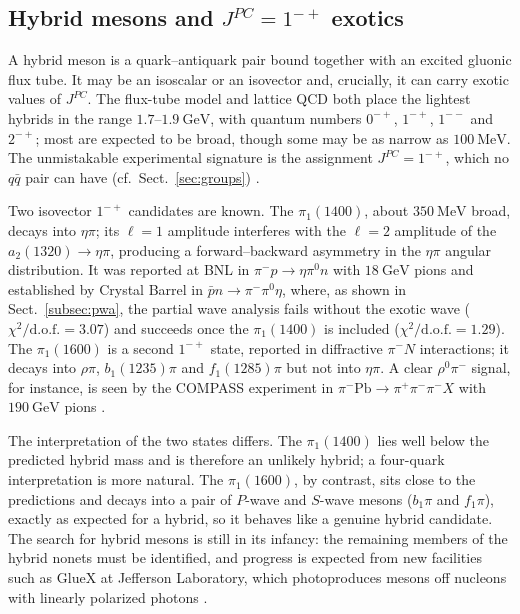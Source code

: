 \FloatBarrier

\subsection{Hybrid mesons and $J^{PC}=1^{-+}$ exotics}
\label{subsec:hybrids}

A hybrid meson is a quark--antiquark pair bound together with an excited gluonic
flux tube. It may be an isoscalar or an isovector and, crucially, it can carry
exotic values of $J^{PC}$. The flux-tube model and lattice QCD both place the
lightest hybrids in the range $1.7$--$1.9~\mathrm{GeV}$, with quantum numbers
$0^{-+}$, $1^{-+}$, $1^{--}$ and $2^{-+}$; most are expected to be broad, though
some may be as narrow as $100~\mathrm{MeV}$. The unmistakable experimental signature
is the assignment $J^{PC}=1^{-+}$, which no $q\bar q$ pair can have (cf.\
Sect.~\ref{sec:groups}) \cite[Ch.~11]{Amsler2018}.

Two isovector $1^{-+}$ candidates are known. The $\pi_1(1400)$, about
$350~\mathrm{MeV}$ broad, decays into $\eta\pi$; its $\ell=1$ amplitude interferes
with the $\ell=2$ amplitude of the $a_2(1320)\to\eta\pi$, producing a
forward--backward asymmetry in the $\eta\pi$ angular distribution. It was reported
at BNL in $\pi^-p\to\eta\pi^0 n$ with $18~\mathrm{GeV}$ pions and established by
Crystal Barrel in $\bar p n\to\pi^-\pi^0\eta$, where, as shown in
Sect.~\ref{subsec:pwa}, the partial wave analysis fails without the exotic wave
($\chi^2/\mathrm{d.o.f.}=3.07$) and succeeds once the $\pi_1(1400)$ is included
($\chi^2/\mathrm{d.o.f.}=1.29$). The $\pi_1(1600)$ is a second $1^{-+}$ state,
reported in diffractive $\pi^- N$ interactions; it decays into $\rho\pi$,
$b_1(1235)\pi$ and $f_1(1285)\pi$ but not into $\eta\pi$. A clear $\rho^0\pi^-$
signal, for instance, is seen by the COMPASS experiment in
$\pi^- \mathrm{Pb}\to\pi^+\pi^-\pi^- X$ with $190~\mathrm{GeV}$ pions
\cite[Ch.~11]{Amsler2018}.

The interpretation of the two states differs. The $\pi_1(1400)$ lies well below the
predicted hybrid mass and is therefore an unlikely hybrid; a four-quark
interpretation is more natural. The $\pi_1(1600)$, by contrast, sits close to the
predictions and decays into a pair of $P$-wave and $S$-wave mesons ($b_1\pi$ and
$f_1\pi$), exactly as expected for a hybrid, so it behaves like a genuine hybrid
candidate. The search for hybrid mesons is still in its infancy: the remaining
members of the hybrid nonets must be identified, and progress is expected from new
facilities such as GlueX at Jefferson Laboratory, which photoproduces mesons off
nucleons with linearly polarized photons \cite[Ch.~11]{Amsler2018}.

